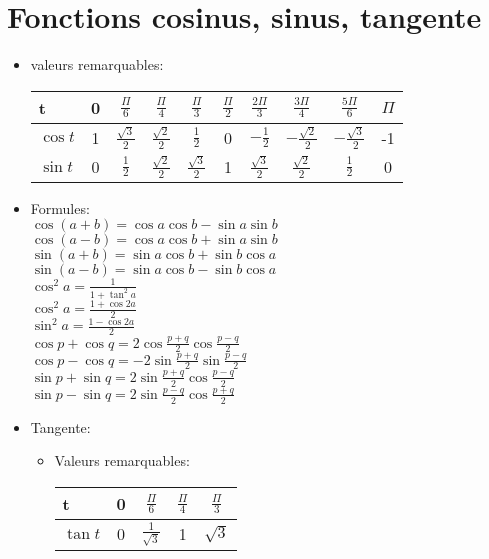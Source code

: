 \documentclass{article}
\begin{document}
\section{Fonctions cosinus, sinus, tangente}
\begin{itemize}
	\item valeurs remarquables:\\
	\begin{tabular}{l|c|c|c|c|c|c|c|c|c}
	t & 0 & $\frac{\Pi}{6}$ & $\frac{\Pi}{4}$ & $\frac{\Pi}{3}$ & $\frac{\Pi}{2}$ & $\frac{2\Pi}{3}$ & $\frac{3\Pi}{4}$ & $\frac{5\Pi}{6}$ & $\Pi$ \\
	\hline
	$\cos t$ & 1 & $\frac{\sqrt{3}}{2}$ & $\frac{\sqrt{2}}{2}$ & $\frac{1}{2}$ & 0 & $-\frac{1}{2}$ & $-\frac{\sqrt{2}}{2}$ & $-\frac{\sqrt{3}}{2}$ & -1 \\
	$\sin t$ & 0 & $\frac{1}{2}$ & $\frac{\sqrt{2}}{2}$ & $\frac{\sqrt{3}}{2}$ & 1 & $\frac{\sqrt{3}}{2}$ & $\frac{\sqrt{2}}{2}$ & $\frac{1}{2}$ & 0 \\
	\end{tabular}

	\item Formules: \\
	$\cos (a+b) = \cos a\cos b - \sin a\sin b$ \\
	$\cos (a-b) = \cos a\cos b + \sin a\sin b$ \\
	$\sin (a+b) = \sin a\cos b + \sin b\cos a$ \\
	$\sin (a-b) = \sin a\cos b - \sin b\cos a$ \\
	$\cos^2 a = \frac{1}{1 + \tan^2a}$ \\
	$\cos^2 a = \frac{1 + \cos 2a}{2}$ \\
	$\sin^2 a = \frac{1 - \cos 2a}{2}$ \\
	\newline
	$\cos p + \cos q = 2\cos\frac{p+q}{2}\cos\frac{p-q}{2}$ \\
	$\cos p - \cos q = -2\sin\frac{p+q}{2}\sin\frac{p-q}{2}$ \\
	$\sin p + \sin q = 2\sin\frac{p+q}{2}\cos\frac{p-q}{2}$ \\
	$\sin p - \sin q = 2\sin\frac{p-q}{2}\cos\frac{p+q}{2}$ \\

	\item Tangente: \\
	\begin{itemize}
		\item Valeurs remarquables: \\
		\begin{tabular}{l|c|c|c|c}
		t        & 0 & $\frac{\Pi}{6}$      & $\frac{\Pi}{4}$ & $\frac{\Pi}{3}$ \\
		\hline
		$\tan t$ & 0 & $\frac{1}{\sqrt{3}}$ & 1               & $\sqrt{3}$ \\
		\end{tabular}


\end{itemize}
\end{itemize}
\end{document}
